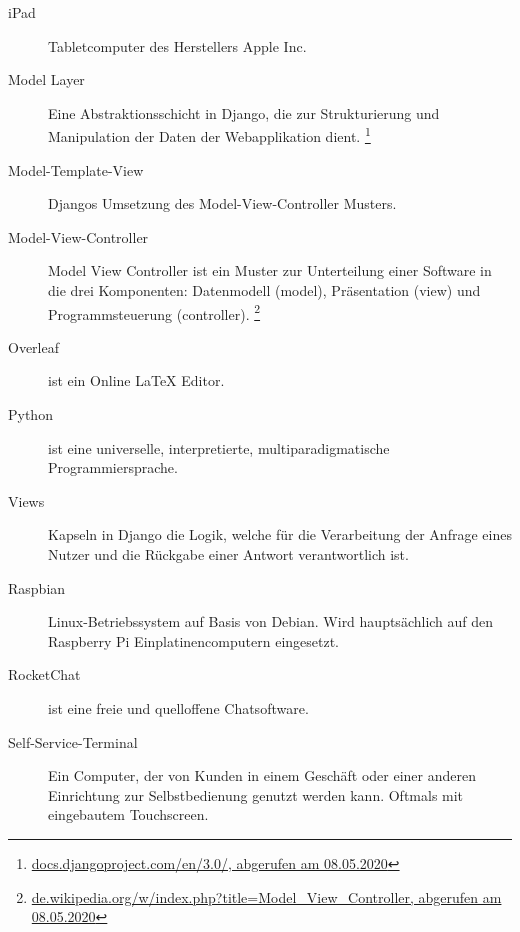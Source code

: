 \begin{description}
  \item[iPad]
    Tabletcomputer des Herstellers Apple Inc.

  \item[Model Layer]
    Eine Abstraktionsschicht in Django, die zur Strukturierung und Manipulation der Daten der Webapplikation dient.
    \footnote{\href{https://docs.djangoproject.com/en/3.0/}{docs.djangoproject.com/en/3.0/, abgerufen am 08.05.2020}}
 
  \item[Model-Template-View]
    Djangos Umsetzung des Model-View-Controller Musters.

  \item[Model-View-Controller]
    Model View Controller ist ein Muster zur Unterteilung einer Software in die drei Komponenten: Datenmodell (model), Präsentation (view) und Programmsteuerung (controller).
    \footnote{\href{https://de.wikipedia.org/w/index.php?title=Model_View_Controller&oldid=195305891}{de.wikipedia.org/w/index.php?title=Model\_View\_Controller, abgerufen am 08.05.2020}}
    
  \item[Overleaf]    
    ist ein Online LaTeX Editor. 

  \item[Python]
    ist eine universelle, interpretierte, multiparadigmatische Programmiersprache.
 
  \item[Views]
    Kapseln in Django die Logik, welche für die Verarbeitung der Anfrage eines Nutzer und die Rückgabe einer Antwort verantwortlich ist.

  \item[Raspbian]
    Linux-Betriebssystem auf Basis von Debian. Wird hauptsächlich auf den Raspberry Pi Einplatinencomputern eingesetzt.
    
  \item[RocketChat]
    ist eine freie und quelloffene Chatsoftware.

  \item[Self-Service-Terminal]
    Ein Computer, der von Kunden in einem Geschäft oder einer anderen Einrichtung zur Selbstbedienung genutzt werden kann. Oftmals mit eingebautem Touchscreen.
\end{description}
